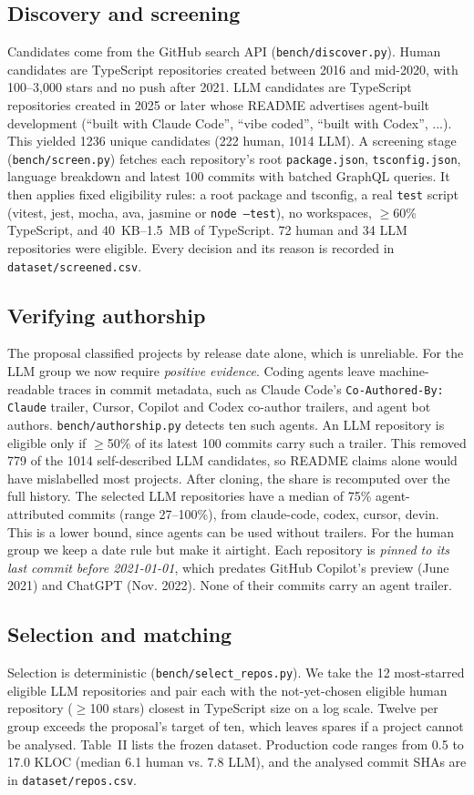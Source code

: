 \documentclass[10pt,conference]{IEEEtran}
\begin{document}
\subsection{Discovery and screening}
Candidates come from the GitHub search API (\texttt{bench/discover.py}). Human candidates are TypeScript repositories created between 2016 and mid-2020, with 100--3,000 stars and no push after 2021. LLM candidates are TypeScript repositories created in 2025 or later whose README advertises agent-built development (“built with Claude Code”, “vibe coded”, “built with Codex”, ...). This yielded 1236 unique candidates (222 human, 1014 LLM). A screening stage (\texttt{bench/screen.py}) fetches each repository's root \texttt{package.json}, \texttt{tsconfig.json}, language breakdown and latest 100 commits with batched GraphQL queries. It then applies fixed eligibility rules: a root package and tsconfig, a real \texttt{test} script (vitest, jest, mocha, ava, jasmine or \texttt{node --test}), no workspaces, $\geq$60\% TypeScript, and 40~KB--1.5~MB of TypeScript. 72 human and 34 LLM repositories were eligible. Every decision and its reason is recorded in \texttt{dataset/screened.csv}.

\subsection{Verifying authorship}
The proposal classified projects by release date alone, which is unreliable. For the LLM group we now require \emph{positive evidence}. Coding agents leave machine-readable traces in commit metadata, such as Claude Code's \texttt{Co-Authored-By: Claude} trailer, Cursor, Copilot and Codex co-author trailers, and agent bot authors. \texttt{bench/authorship.py} detects ten such agents. An LLM repository is eligible only if $\geq$50\% of its latest 100 commits carry such a trailer. This removed 779 of the 1014 self-described LLM candidates, so README claims alone would have mislabelled most projects. After cloning, the share is recomputed over the full history. The selected LLM repositories have a median of 75\% agent-attributed commits (range 27--100\%), from claude-code, codex, cursor, devin. This is a lower bound, since agents can be used without trailers. For the human group we keep a date rule but make it airtight. Each repository is \emph{pinned to its last commit before 2021-01-01}, which predates GitHub Copilot's preview (June 2021) and ChatGPT (Nov. 2022). None of their commits carry an agent trailer.

\subsection{Selection and matching}
Selection is deterministic (\texttt{bench/select\_repos.py}). We take the 12 most-starred eligible LLM repositories and pair each with the not-yet-chosen eligible human repository ($\geq$100 stars) closest in TypeScript size on a log scale. Twelve per group exceeds the proposal's target of ten, which leaves spares if a project cannot be analysed. Table~II lists the frozen dataset. Production code ranges from 0.5 to 17.0 KLOC (median 6.1 human vs. 7.8 LLM), and the analysed commit SHAs are in \texttt{dataset/repos.csv}.
\end{document}
